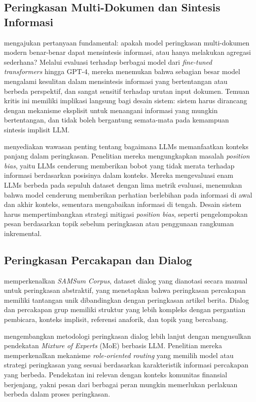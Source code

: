 \subsection{Peringkasan Multi-Dokumen dan Sintesis Informasi}

\textcite{deyoung2024} mengajukan pertanyaan fundamental: apakah model peringkasan multi-dokumen modern benar-benar dapat mensintesis informasi, atau hanya melakukan agregasi sederhana? Melalui evaluasi terhadap berbagai model dari \textit{fine-tuned transformers} hingga GPT-4, mereka menemukan bahwa sebagian besar model mengalami kesulitan dalam mensintesis informasi yang bertentangan atau berbeda perspektif, dan sangat sensitif terhadap urutan input dokumen. Temuan kritis ini memiliki implikasi langsung bagi desain sistem: sistem harus dirancang dengan mekanisme eksplisit untuk menangani informasi yang mungkin bertentangan, dan tidak boleh bergantung semata-mata pada kemampuan sintesis implisit LLM.

\textcite{ravaut2024} menyediakan wawasan penting tentang bagaimana LLMs memanfaatkan konteks panjang dalam peringkasan. Penelitian mereka mengungkapkan masalah \textit{position bias}, yaitu LLMs cenderung memberikan bobot yang tidak merata terhadap informasi berdasarkan posisinya dalam konteks. Mereka mengevaluasi enam LLMs berbeda pada sepuluh dataset dengan lima metrik evaluasi, menemukan bahwa model cenderung memberikan perhatian berlebihan pada informasi di awal dan akhir konteks, sementara mengabaikan informasi di tengah. Desain sistem harus mempertimbangkan strategi mitigasi \textit{position bias}, seperti pengelompokan pesan berdasarkan topik sebelum peringkasan atau penggunaan rangkuman inkremental.

\subsection{Peringkasan Percakapan dan Dialog}

\textcite{gliwa2019} memperkenalkan \textit{SAMSum Corpus}, dataset dialog yang dianotasi secara manual untuk peringkasan abstraktif, yang menetapkan bahwa peringkasan percakapan memiliki tantangan unik dibandingkan dengan peringkasan artikel berita. Dialog dan percakapan grup memiliki struktur yang lebih kompleks dengan pergantian pembicara, konteks implisit, referensi anaforik, dan topik yang bercabang.

\textcite{tian2024} mengembangkan metodologi peringkasan dialog lebih lanjut dengan mengusulkan pendekatan \textit{Mixture of Experts} (MoE) berbasis LLM. Penelitian mereka memperkenalkan mekanisme \textit{role-oriented routing} yang memilih model atau strategi peringkasan yang sesuai berdasarkan karakteristik informasi percakapan yang berbeda. Pendekatan ini relevan dengan konteks komunitas finansial berjenjang, yakni pesan dari berbagai peran mungkin memerlukan perlakuan berbeda dalam proses peringkasan.

